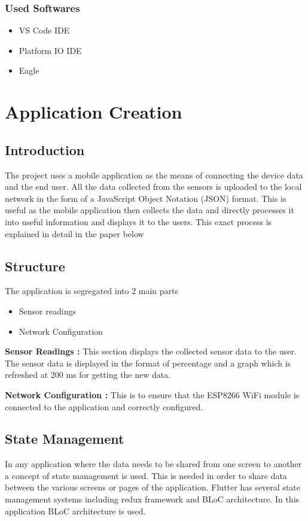 \documentclass[conference]{IEEEtran}
\begin{document}
\subsubsection{Used Softwares}
\begin{itemize}
    \item VS Code IDE
    \item Platform IO IDE
    \item Eagle
\end{itemize}

\section{Application Creation}
\subsection{Introduction}
The project uses a mobile application as the means of connecting
the device data and the end user. All the data collected from
the sensors is uploaded to the local network in the form of a
JavaScript Object Notation (JSON) format. This is useful as the
mobile application then collects the data and directly processes
it into useful information and displays it to the users. This exact
process is explained in detail in the paper below

\subsection{Structure}
The application is segregated into 2 main parts
\begin{itemize}
    \item Sensor readings
    \item Network Configuration
\end{itemize}

\textbf{Sensor Readings : }This section displays the collected
sensor data to the user. The sensor data is displayed in the
format of percentage and a graph which is refreshed at 200 ms
for getting the new data.

\textbf{Network Configuration : } This is to ensure that the
ESP8266 WiFi module is connected to the application and correctly
configured.

\subsection{State Management}
In any application where the data needs to be shared from one
screen to another a concept of state management is used.\cite{[10]}
This is needed in order to share data between the various
screens or pages of the application. Flutter has several
state management systems including redux framework and BLoC
architecture\cite{[9]}. In this application BLoC architecture is
used.
\end{document}

